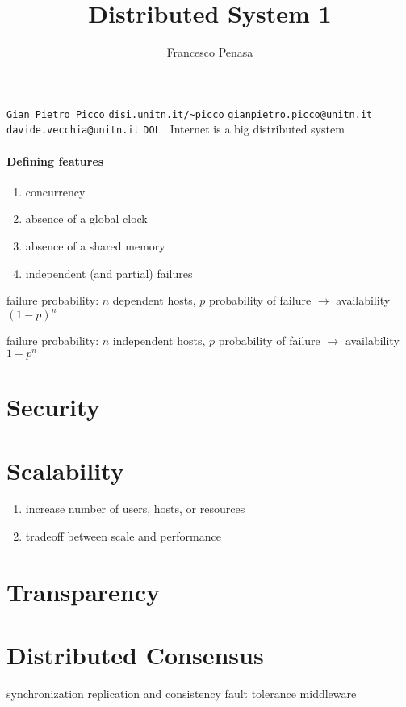 \documentclass[11pt]{article}
\begin{document}
\author{Francesco Penasa}
\title{Distributed System 1}
\maketitle

\medskip

\texttt{Gian Pietro Picco}
\texttt{disi.unitn.it/\~{}picco}
\texttt{gianpietro.picco@unitn.it}
\texttt{davide.vecchia@unitn.it}
\texttt{DOL }
Internet is a big distributed system

\paragraph{Defining features} %
\label{par:defining_features}
\begin{enumerate}
	\item concurrency
	\item absence of a global clock
	\item absence of a shared memory
	\item independent (and partial) failures
\end{enumerate}

failure probability: $n$ dependent hosts, $p$ probability of failure
$\rightarrow$ availability $(1-p)^n$

failure probability: $n$ independent hosts, $p$ probability of failure
$\rightarrow$ availability $1-p^n$

\section{Security} %
\label{sec:security}


\section{Scalability} %
\label{sec:scalability}
\begin{enumerate}
	\item increase number of users, hosts, or resources
	\item tradeoff between scale and performance
\end{enumerate}


\section{Transparency} %
\label{sec:transparency}



\section{Distributed Consensus} %
\label{sec:distributed_consensus}




synchronization
replication and consistency
fault tolerance
middleware
\end{document}

